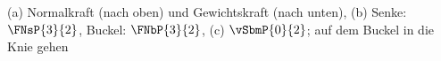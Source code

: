 (a) Normalkraft (nach oben) und Gewichtskraft (nach unten), (b) Senke: $\FNsP{3}{2}$, Buckel: $\FNbP{3}{2}$, (c) $\vSbmP{0}{2}$; auf dem Buckel in die Knie gehen
